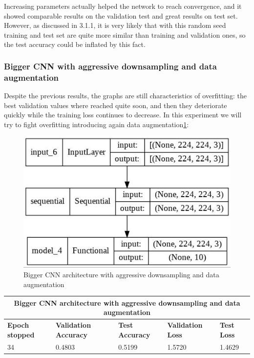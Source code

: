 \medskip

\noindent Increasing parameters actually helped the network to reach convergence, and it showed comparable results on the validation test and great results on test set. However, as discussed in 3.1.1, it is very likely that with this random seed training and test set are quite more similar than training and validation ones, so the test accuracy could be inflated by this fact.

\subsubsection{Bigger CNN with aggressive downsampling and data augmentation}
Despite the previous results, the graphs are still characteristics of overfitting: the best validation values where reached quite soon, and then they deteriorate quickly while the training loss continues to decrease. In this experiment we will try to fight overfitting introducing again data augmentation\ref{fig:dataAugmentedAggressiveDownsamplingCNN}:

\begin{figure}[H]
	\centering
	\includegraphics[height=0.2\textwidth]{img/scratch/DataAugmentedAggressiveDownsamplingCNN.jpg}
	\caption{Bigger CNN architecture with aggressive downsampling and data augmentation}
	\label{fig:dataAugmentedAggressiveDownsamplingCNN}
\end{figure}

\medskip

\begin{tabular}{ |p{2cm}|p{2cm}|p{2cm}|p{2cm}|p{2cm}|  }
\hline
\multicolumn{5}{|c|}{Bigger CNN architecture with aggressive downsampling and data augmentation} \\
\hline
\textbf{Epoch stopped} & \textbf{Validation Accuracy} & \textbf{Test Accuracy} & \textbf{Validation Loss} & \textbf{Test Loss} \\
\hline
34 & 0.4803 & 0.5199 & 1.5720 & 1.4629\\
\hline
\end{tabular}

\medskip


